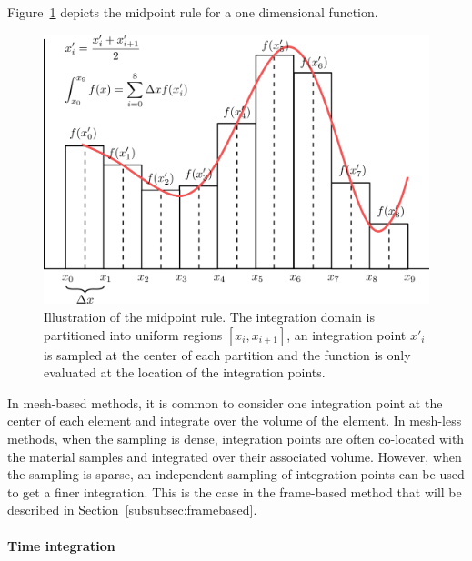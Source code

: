 Figure~\ref{fig:spatialIntegration} depicts the midpoint rule for a one dimensional function.
\begin{figure}[!ht]
	\centering
	\includegraphics[scale=1.0]{images/continuum_mechanics/spatialIntegration.png}
	\caption[STAR mechanics: Spatial integration]{\label{fig:spatialIntegration} Illustration of the midpoint rule. The integration domain is partitioned into uniform regions $\left[x_{i}, x_{i+1}\right]$, an integration point $x'_{i}$ is sampled at the center of each partition and the function is only evaluated at the location of the integration points.}
\end{figure}

In mesh-based methods, it is common to consider one integration point at the center of each element and integrate over the volume of the element.
In mesh-less methods, when the sampling is dense, integration points are often co-located with the material samples and integrated over their associated volume. 
However, when the sampling is sparse, an independent sampling of integration points can be used to get a finer integration.
This is the case in the frame-based method that will be described in Section~\ref{subsubsec:framebased}.

\paragraph{Time integration}

